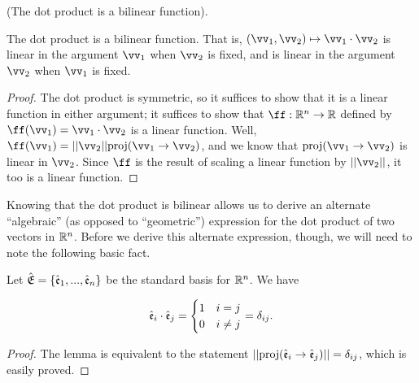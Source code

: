 \begin{theorem}
\label{ch::lin_alg::thm::geom_dot_product_bilinear}
    (The dot product is a bilinear function).
    
    The dot product is a bilinear function. That is, $(\vv_1, \vv_2) \mapsto \vv_1 \cdot \vv_2$ is linear in the argument $\vv_1$ when $\vv_2$ is fixed, and is linear in the argument $\vv_2$ when $\vv_1$ is fixed.
\end{theorem}

\begin{proof}
    The dot product is symmetric, so it suffices to show that it is a linear function in either argument; it suffices to show that $\ff:\R^n \rightarrow \R$ defined by $\ff(\vv_1) = \vv_1 \cdot \vv_2$ is a linear function. Well, ${\ff(\vv_1) = ||\vv_2||\proj(\vv_1 \rightarrow \vv_2)}$, and we know that $\proj(\vv_1 \rightarrow \vv_2)$ is linear in $\vv_2$. Since $\ff$ is the result of scaling a linear function by $||\vv_2||$, it too is a linear function.
\end{proof}

Knowing that the dot product is bilinear allows us to derive an alternate ``algebraic'' (as opposed to ``geometric'') expression for the dot product of two vectors in $\mathbb{R}^n$. Before we derive this alternate expression, though, we will need to note the following basic fact.

\begin{lemma}
    Let ${\hat{\mathfrak{E}}} = \{\hat{\mathfrak{e}}_1, ..., \hat{\mathfrak{e}}_n\}$ be the standard basis for $\mathbb{R}^n$. We have
    
    \begin{align*}
        \hat{\mathfrak{e}}_i \cdot \hat{\mathfrak{e}}_j = 
        \begin{cases}
            1 & i = j \\
            0 & i \neq j
        \end{cases}
        = \delta_{ij}.
    \end{align*}
\end{lemma}

\begin{proof}
   The lemma is equivalent to the statement $||\text{proj}(\hat{\mathfrak{e}}_i \rightarrow \hat{\mathfrak{e}}_j)|| = \delta_{ij}$, which is easily proved.
\end{proof}

